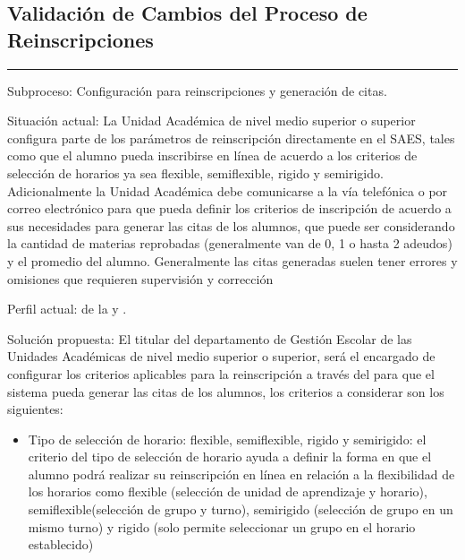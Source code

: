 \subsection{Validación de Cambios del Proceso de Reinscripciones}
\label{sec:PF-GR:validacion}


\hrule
\vspace{0.2cm}
\begin{Cdescription}
	\item[Subproceso:] Configuración para reinscripciones y generación de citas.
	\item[Situación actual:] La Unidad Académica de nivel medio superior o superior configura parte de los parámetros de reinscripción directamente en el SAES, tales como que el alumno pueda inscribirse en línea de acuerdo a los criterios de selección de horarios ya sea flexible, semiflexible, rigido y semirigido. Adicionalmente la Unidad Académica debe comunicarse a la  vía telefónica o por correo electrónico para que pueda definir los criterios de inscripción de acuerdo a sus necesidades para generar las citas de los alumnos, que puede ser considerando la cantidad de materias reprobadas (generalmente van de 0, 1 o hasta 2 adeudos) y el promedio del alumno. Generalmente las citas generadas suelen tener errores y omisiones que requieren supervisión y corrección  
	\item[Perfil actual:]  de la  y .
	\item[Solución propuesta:] El titular del departamento de Gestión Escolar de las Unidades Académicas  de nivel medio superior o superior, será el encargado de configurar los criterios aplicables para la reinscripción a través del  para que el sistema pueda generar las citas de los alumnos, los criterios a considerar son los siguientes:\\
	\begin{itemize}
		\item Tipo de selección de horario: flexible, semiflexible, rigido y semirigido: el criterio del tipo de selección de horario ayuda a definir la forma en que el alumno podrá realizar su reinscripción en línea en relación a la flexibilidad de los horarios como flexible (selección de unidad de aprendizaje y horario), semiflexible(selección de grupo y turno), semirigido (selección de grupo en un mismo turno) y rigido (solo permite seleccionar un grupo en el horario establecido) 

\end{itemize}
\end{Cdescription}
